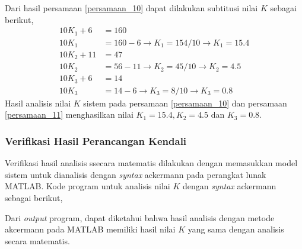 \documentclass[../main.tex]{subfiles}
\begin{document}
                Dari hasil persamaan \eqref{persamaan_10} dapat dilakukan subtitusi nilai $K$ sebagai berikut,
                \begin{equation}
                    \begin{split}
                        10K_1 + 6 &= 160 \\[5pt] 
                        10K_1 &= 160 - 6 \rightarrow K_1 = 154/10 \rightarrow K_1 = 15.4 \\[10pt]
                        10K_2 + 11 &= 47 \\[5pt] 
                        10K_2 &= 56 - 11 \rightarrow K_2 = 45/10 \rightarrow K_2 = 4.5 \\[10pt]
                        10K_3 + 6 &= 14 \\[5pt] 
                        10K_3 &= 14 - 6 \rightarrow K_3 = 8/10 \rightarrow K_3 = 0.8
                        \label{persamaan_11}
                    \end{split}
                \end{equation}
                Hasil analisis nilai $K$ sistem pada persamaan \eqref{persamaan_10} dan persamaan \eqref{persamaan_11} menghasilkan nilai $K_1 = 15.4, K_2 = 4.5$ dan $K_3 = 0.8$.
            \subsubsection{Verifikasi Hasil Perancangan Kendali}
                Verifikasi hasil analisis ssecara matematis dilakukan dengan memasukkan model sistem untuk dianalisis dengan \textit{syntax} ackermann pada perangkat lunak MATLAB. Kode program untuk analisis nilai $K$ dengan \textit{syntax} ackermann sebagai berikut,
                
                Dari \textit{output} program, dapat diketahui bahwa hasil analisis dengan metode akcermann pada MATLAB memiliki hasil nilai $K$ yang sama dengan analisis secara matematis.
                
\end{document}
